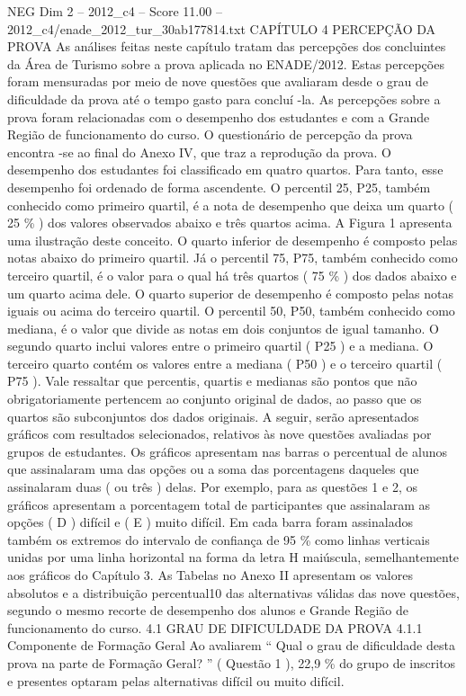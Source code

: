 \begin{textsample}{NEG Dim 2 – 2012\_c4 – Score 11.00 – 2012\_c4/enade\_2012\_tur\_30ab177814.txt}  \label{ex:f2_neg_331}
CAPÍTULO 4 PERCEPÇÃO DA PROVA As análises feitas neste capítulo tratam das percepções dos concluintes da Área de Turismo sobre a prova aplicada no ENADE/2012.
Estas percepções foram mensuradas por meio de nove questões que avaliaram desde o grau de dificuldade da prova até o tempo gasto para concluí -la.
As percepções sobre a prova foram relacionadas com o desempenho dos estudantes e com a Grande Região de funcionamento do curso.
O questionário de percepção da prova encontra -se ao final do Anexo IV, que traz a reprodução da prova.
O desempenho dos estudantes foi classificado em quatro quartos.
Para tanto, esse desempenho foi ordenado de forma ascendente.
O percentil 25, P25, também conhecido como primeiro quartil, é a nota de desempenho que deixa um quarto ( 25 \% ) dos valores observados abaixo e três quartos acima.
A Figura 1 apresenta uma ilustração deste conceito.
O quarto inferior de desempenho é composto pelas notas abaixo do primeiro quartil.
Já o percentil 75, P75, também conhecido como terceiro quartil, é o valor para o qual há três quartos ( 75 \% ) dos dados abaixo e um quarto acima dele.
O quarto superior de desempenho é composto pelas notas iguais ou acima do terceiro quartil.
O percentil 50, P50, também conhecido como mediana, é o valor que divide as notas em dois conjuntos de igual tamanho.
O segundo quarto inclui valores entre o primeiro quartil ( P25 ) e a mediana.
O terceiro quarto contém os valores entre a mediana ( P50 ) e o terceiro quartil ( P75 ).
Vale ressaltar que percentis, quartis e medianas são pontos que não obrigatoriamente pertencem ao conjunto original de dados, ao passo que os quartos são subconjuntos dos dados originais.
A seguir, serão apresentados gráficos com resultados selecionados, relativos às nove questões avaliadas por grupos de estudantes.
Os gráficos apresentam nas barras o percentual de alunos que assinalaram uma das opções ou a soma das porcentagens daqueles que assinalaram duas ( ou três ) delas.
Por exemplo, para as questões 1 e 2, os gráficos apresentam a porcentagem total de participantes que assinalaram as opções ( D ) difícil e ( E ) muito difícil.
Em cada barra foram assinalados também os extremos do intervalo de confiança de 95 \% como linhas verticais unidas por uma linha horizontal na forma da letra H maiúscula, semelhantemente aos gráficos do Capítulo 3.
As Tabelas no Anexo II apresentam os valores absolutos e a distribuição percentual10 das alternativas válidas das nove questões, segundo o mesmo recorte de desempenho dos alunos e Grande Região de funcionamento do curso. 4.1 GRAU DE DIFICULDADE DA PROVA 4.1.1 Componente de Formação Geral Ao avaliarem “ Qual o grau de dificuldade desta prova na parte de Formação Geral? ” ( Questão 1 ), 22,9 \% do grupo de inscritos e presentes optaram pelas alternativas difícil ou muito difícil.

\end{textsample}
